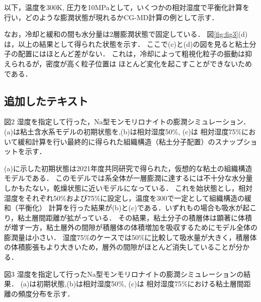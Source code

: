 以下，温度を300K, 圧力を10MPaとして，いくつかの相対湿度で平衡化計算を 行い，どのような膨潤状態が現れるかCG-MD計算の例として示す． 

なお，冷却と緩和の間も水分量は2層膨潤状態で固定している．
図\ref{fig:fig3}(d)は，以上の結果として得られた状態を示す．
ここで(c)と(d)の図を見ると粘土分子の配置にはほとんど差がない．
これは，冷却によって粗視化粒子の振動は抑えられるが，密度が高く粒子位置は
ほとんど変化を起こすことができないためである．

\subsection{追加したテキスト}
図2
湿度を指定して行った，Na型モンモリロナイトの膨潤シミュレーション．(a)は粘土含水系モデルの初期状態を,(b)は相対湿度50$\%$, 
(c)は 相対湿度75$\%$において緩和計算を行い最終的に得られた組織構造（粘土分子配置）のスナップショットを示す．

(a)に示した初期状態は2021年度共同研究で得られた，仮想的な粘土の組織構造モデルである．
このモデルでは系全体が一層膨潤に達するには不十分な水分量しかもたない，乾燥状態に近いモデルになっている．
これを始状態とし，相対湿度をそれぞれ50$\%$および75$\%$に設定し，温度を300で一定として組織構造の緩和（平衡化）
計算を行った結果が(b)と(c)である．いずれもの場合も吸水が起こり，粘土層間距離が拡がっている．
その結果，粘土分子の積層体は顕著に体積が増す一方，粘土層外の間隙が積層体の体積増加を吸収するためにモデル全体の膨潤量は小さい．
湿度75$\%$のケースでは50$\%$に比較して吸水量が大きく，積層体の体積膨張もより大きいため，層外の間隙がほとんど消失していることが分かる．

図3
湿度を指定して行ったNa型モンモリロナイトの膨潤シミュレーションの結果．
(a)は初期状態,(b)は相対湿度50$\%$, (c)は 相対湿度75$\%$における粘土層間距離の頻度分布を示す．


